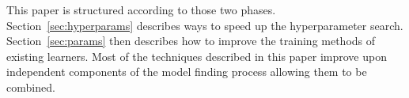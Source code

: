 This paper is structured according to those two phases.
Section~\ref{sec:hyperparams} describes ways to speed up the hyperparameter search.
Section~\ref{sec:params} then describes how to improve the training methods of existing learners.
Most of the techniques described in this paper improve upon independent components of the model finding process allowing them to be combined.
